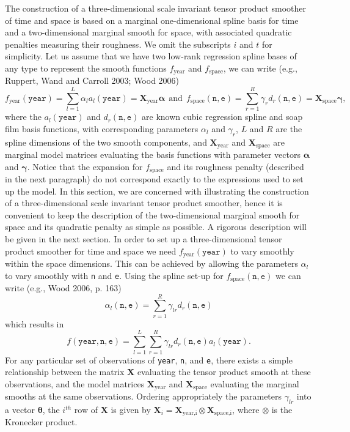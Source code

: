 \documentclass[10pt] {article}
\theoremstyle{definition}
\theoremstyle{plain}
\begin{document}
The construction of a three-dimensional scale invariant tensor product smoother of time and space is based on a marginal one-dimensional spline basis for time and a two-dimensional marginal smooth for space, with associated quadratic penalties measuring their roughness. We omit the subscripts $i$ and $t$ for simplicity. Let us assume that we have two low-rank regression spline bases of any type to represent the smooth functions $f_\text{year}$ and $f_\text{space}$, we can write (e.g., Ruppert, Wand and Carroll 2003; Wood 2006)
$$
f_\text{year}(\texttt{year})=\sum_{l=1}^L \alpha_l a_l(\texttt{year})=\textbf{X}_\text{year}\bm\alpha \ \ \text{and} \ \ f_\text{space}(\texttt{n},\texttt{e})=\sum_{r=1}^R \gamma_r d_r(\texttt{n},\texttt{e})=\textbf{X}_\text{space}\bm\gamma,
$$
where the $a_l(\texttt{year})$ and $d_r(\texttt{n},\texttt{e})$ are known cubic regression spline and soap film basis functions, with corresponding parameters $\alpha_l$ and $\gamma_r$, $L$ and $R$ are the spline dimensions of the two smooth components, and $\textbf{X}_\text{year}$ and $\textbf{X}_\text{space}$ are marginal model matrices evaluating the basis functions with parameter vectors $\bm\alpha$ and $\bm\gamma$. Notice that the expansion for $f_\text{space}$ and its roughness penalty (described in the next paragraph) do not correspond exactly to the expressions used to set up the model. In this section, we are concerned with illustrating the construction of a three-dimensional scale invariant tensor product smoother, hence it is convenient to keep the description of the two-dimensional marginal smooth for space and its quadratic penalty as simple as possible. A rigorous description will be given in the next section. In order to set up a three-dimensional tensor product smoother for time and space we need $f_\text{year}(\texttt{year})$ to vary smoothly within the space dimensions. This can be achieved by allowing the parameters $\alpha_l$ to vary smoothly with \texttt{n} and \texttt{e}. Using the spline set-up for $f_\text{space}(\texttt{n},\texttt{e})$ we can write (e.g., Wood 2006, p. 163)
$$
\alpha_l(\texttt{n},\texttt{e})=\sum_{r=1}^R \gamma_{lr} d_r(\texttt{n},\texttt{e})
$$    
which results in
$$
f(\texttt{year},\texttt{n},\texttt{e})=\sum_{l=1}^L \sum_{r=1}^R \gamma_{lr} d_r(\texttt{n},\texttt{e}) a_l(\texttt{year}). 
$$
For any particular set of observations of \texttt{year}, \texttt{n}, and \texttt{e}, there exists a simple relationship between the matrix $\textbf{X}$ evaluating the tensor product smooth at these observations, and the model matrices $\textbf{X}_\text{year}$ and $\textbf{X}_\text{space}$ evaluating the marginal smooths at the same observations. Ordering appropriately the parameters $\gamma_{lr}$ into a vector $\bm\theta$, the $i^{th}$ row of $\textbf{X}$ is given by $\textbf{X}_{i}=\textbf{X}_\text{year,i}\otimes\textbf{X}_\text{space,i}$, where $\otimes$ is the Kronecker product. 
\end{document}
